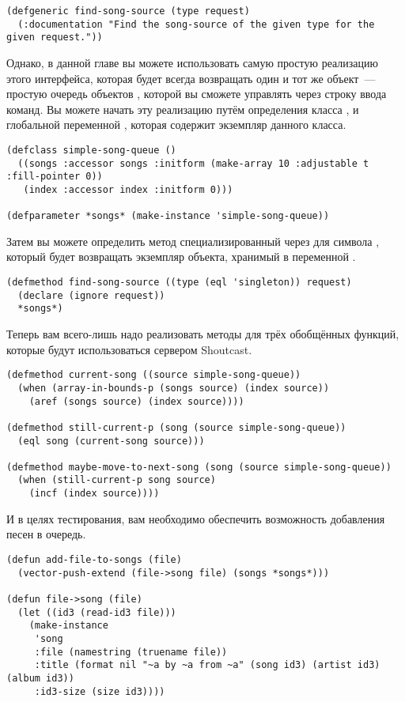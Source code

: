 \begin{lstlisting}
(defgeneric find-song-source (type request)
  (:documentation "Find the song-source of the given type for the given request."))
\end{lstlisting}

Однако, в данной главе вы можете использовать самую простую реализацию этого интерфейса,
которая будет всегда возвращать один и тот же объект~--- простую очередь объектов
, которой вы сможете управлять через строку ввода команд. Вы можете начать эту
реализацию путём определения класса , и глобальной переменной
, которая содержит экземпляр данного класса.

\begin{lstlisting}
(defclass simple-song-queue ()
  ((songs :accessor songs :initform (make-array 10 :adjustable t :fill-pointer 0))
   (index :accessor index :initform 0)))

(defparameter *songs* (make-instance 'simple-song-queue))
\end{lstlisting}

Затем вы можете определить метод  специализированный через
 для символа , который будет возвращать экземпляр объекта,
хранимый в переменной .

\begin{lstlisting}
(defmethod find-song-source ((type (eql 'singleton)) request)
  (declare (ignore request))
  *songs*)
\end{lstlisting}

Теперь вам всего-лишь надо реализовать методы для трёх обобщённых функций, которые будут
использоваться сервером Shoutcast.

\begin{lstlisting}
(defmethod current-song ((source simple-song-queue))
  (when (array-in-bounds-p (songs source) (index source))
    (aref (songs source) (index source))))

(defmethod still-current-p (song (source simple-song-queue))
  (eql song (current-song source)))

(defmethod maybe-move-to-next-song (song (source simple-song-queue))
  (when (still-current-p song source)
    (incf (index source))))
\end{lstlisting}

И в целях тестирования, вам необходимо обеспечить возможность добавления песен в очередь.

\begin{lstlisting}
(defun add-file-to-songs (file)
  (vector-push-extend (file->song file) (songs *songs*)))

(defun file->song (file)
  (let ((id3 (read-id3 file)))
    (make-instance 
     'song
     :file (namestring (truename file))
     :title (format nil "~a by ~a from ~a" (song id3) (artist id3) (album id3))
     :id3-size (size id3))))
\end{lstlisting}

